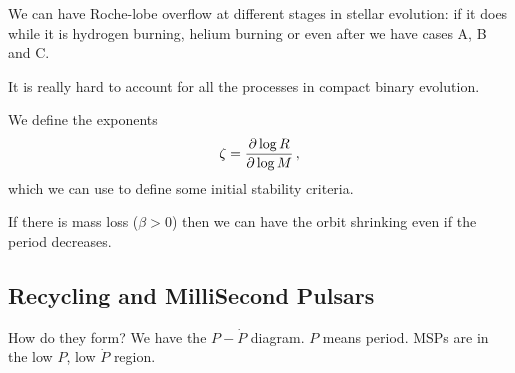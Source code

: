\documentclass[main.tex]{subfiles}
\begin{document}
We can have Roche-lobe overflow at different stages in stellar evolution: if it does while it is hydrogen burning, helium burning or even after we have cases A, B and C. 

It is really hard to account for all the processes in compact binary evolution. 

We define the exponents 
%
\begin{align}
\zeta  = \pdv{\log R}{\log M }
\,,
\end{align}
%
which we can use to define some initial stability criteria. 

If there is mass loss (\(\beta >0\)) then we can have the orbit shrinking even if the period decreases. 

\subsection{Recycling and MilliSecond Pulsars}

How do they form? We have the \(P - \dot{P}\) diagram. \(P\) means period. 
MSPs are in the low \(P\), low \(\dot{P}\) region. 
\end{document}
